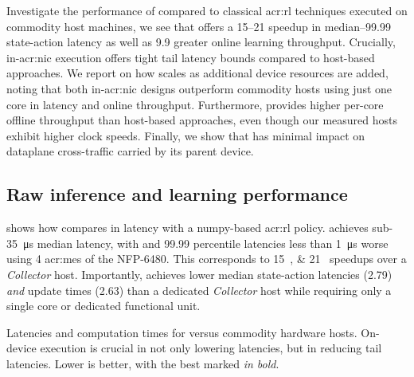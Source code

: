 Investigate the performance of \approachshort{} compared to classical \gls{acr:rl} techniques executed on commodity host machines, we see that \Coopfw{} offers a \qtyrange{15}{21}{\times} speedup in median--\num{99.99} state-action latency as well as \qty{9.9}{\times} greater online learning throughput.
Crucially, in-\gls{acr:nic} execution offers tight tail latency bounds compared to host-based approaches.
We report on how \approachshort{} scales as additional device resources are added, noting that both in-\gls{acr:nic} designs outperform commodity hosts using just one core in latency and online throughput.
Furthermore, \Indfw{} provides higher per-core offline throughput than host-based approaches, even though our measured hosts exhibit higher clock speeds.
Finally, we show that \approachshort{} has minimal impact on dataplane cross-traffic carried by its parent device.

\subsection{Raw inference and learning performance}\label{sec:opal-results-inference}
 shows how \approachshort{} compares in latency with a numpy-based \gls{acr:rl} policy.
\Coopfw{} achieves sub-\qty{35}{\micro\second} median latency, with  and \num{99.99} percentile latencies less than \qty{1}{\micro\second} worse using 4 \glspl{acr:me} of the NFP-6480.
This corresponds to \qtylist{15;21}{\times} speedups over a \emph{Collector} host.
Importantly, \Indfw{} achieves lower median state-action latencies (\qty{2.79}{\times}) \emph{and} update times (\qty{2.63}{\times}) than a dedicated \emph{Collector} host while requiring only a single core or dedicated functional unit.

\newlength{\resultplotwidth}
\setlength{\resultplotwidth}{\linewidth}

\begin{table}
	\caption[Latencies and computation times for \approachshort{} versus commodity hardware hosts.]{Latencies and computation times for \approachshort{} versus commodity hardware hosts. On-device execution is crucial in not only lowering latencies, but in reducing tail latencies. Lower is better, with the best marked \emph{in bold}.\label{tab:lats}}
\end{table}

